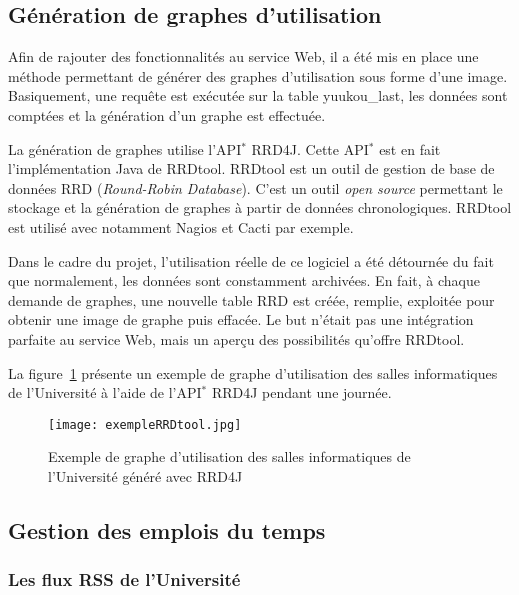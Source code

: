 \subsection{G\'en\'eration de graphes d'utilisation}

Afin de rajouter des fonctionnalit\'es au service Web, il a \'et\'e mis en place une m\'ethode permettant de g\'en\'erer des graphes d'utilisation sous forme d'une image.
Basiquement, une requ\^ete est ex\'ecut\'ee sur la table \textsf{yuukou\_last}, les donn\'ees sont compt\'ees et la g\'en\'eration d'un graphe est effectu\'ee.

La g\'en\'eration de graphes utilise l'API$^*$ RRD4J.
Cette API$^*$ est en fait l'impl\'ementation Java de RRDtool.
RRDtool est un outil de gestion de base de donn\'ees RRD (\textit{Round-Robin Database}).
C'est un outil \textit{open source} permettant le stockage et la g\'en\'eration de graphes \`a partir de donn\'ees chronologiques.
RRDtool est utilis\'e avec notamment Nagios et Cacti par exemple.

Dans le cadre du projet, l'utilisation r\'eelle de ce logiciel a \'et\'e d\'etourn\'ee du fait que normalement, les donn\'ees sont constamment archiv\'ees.
En fait, \`a chaque demande de graphes, une nouvelle table RRD est cr\'e\'ee, remplie, exploit\'ee pour obtenir une image de graphe puis effac\'ee.
Le but n'\'etait pas une int\'egration parfaite au service Web, mais un aper\c{c}u des possibilit\'es qu'offre RRDtool.

La figure~\ref{figure:rrdTool} pr\'esente un exemple de graphe d'utilisation des salles informatiques de l'Universit\'e \`a l'aide de l'API$^*$ RRD4J pendant une journ\'ee.

\clearpage

\begin{figure}[!ht]
	\centering
	\texttt{[image: exempleRRDtool.jpg]}
	\caption{Exemple de graphe d'utilisation des salles informatiques de l'Universit\'e g\'en\'er\'e avec RRD4J}
	\label{figure:rrdTool}

\end{figure}

\subsection{Gestion des emplois du temps}
\label{section:emploiDuTemps}

\subsubsection{Les flux RSS de l'Universit\'e}

